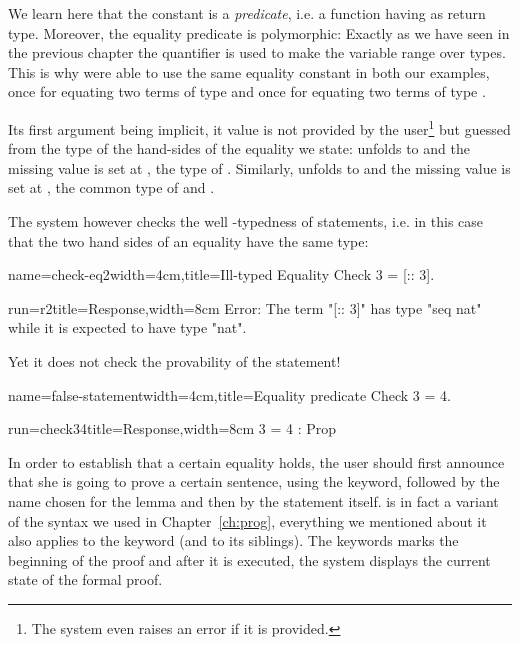 We learn here that the constant  is a \emph{predicate}, i.e. a
function having  as return type. Moreover, the equality
predicate is polymorphic: Exactly as we have seen in the previous
chapter the  quantifier is used to make the variable 
range over types. This is why were able to use the same equality
constant in both our examples, once for equating two terms of type
 and once for equating two terms of type .

Its first argument being implicit, it value is not provided by the
user\footnote{The system even raises an error if it is provided.} but
guessed from the type of the hand-sides of the equality we state:  unfolds to  and the missing value is set at
, the type of . Similarly, 
unfolds to  and the missing value is set
at , the common type of  and .

The \Coq{} system however checks the well -typedness of statements,
i.e. in this case that the two hand sides of an equality have the same
type:

\begin{coq}{name=check-eq2}{width=4cm,title=Ill-typed Equality}
Check 3 = [:: 3].
$~$
\end{coq}
\begin{coqout}{run=r2}{title=Response,width=8cm}
Error: The term "[:: 3]" has type "seq nat"
 while it is expected to have type "nat".
\end{coqout}

Yet it does not check the provability of the statement!

\begin{coq}{name=false-statement}{width=4cm,title=Equality predicate}
Check 3 = 4.
\end{coq}
\begin{coqout}{run=check34}{title=Response,width=8cm}
3 = 4 : Prop
\end{coqout}

In order to establish that a certain equality holds, the user should
first announce that she is going to prove a certain sentence, using
the  keyword, followed by the name chosen for the lemma and
then by the statement itself.  is in fact a variant of the
 syntax we used in Chapter~\ref{ch:prog}, everything we
mentioned about it also applies to the  keyword (and to its
siblings).
The  keywords marks the beginning of the proof and after it
is executed, the system displays the current state of the formal
proof.

